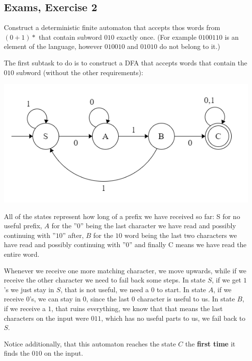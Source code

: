 \subsection {Exams, Exercise 2}


Construct a deterministic finite automaton that accepts thos words from $(0+1)*$ that contain subword $010$ exactly once. (For example $0100110$ is an element of the language, however $010010$ and $01010$ do not belong to it.)


The first subtask to do is to construct a DFA that accepts words that contain the $010$ subword (without the other requirements):

\begin{center}
    \includegraphics[width=\linewidth]{./exams/02/step_1.png}
\end{center}

All of the states represent how long of a prefix we have received so far: S for no useful prefix, $A$ for the ''$0$'' being the last character we have read and possibly continuing with ''$10$'' after, $B$ for the $10$ word being the last two characters we have read and possibly continuing with ''$0$'' and finally C means we have read the entire word.

Whenever we receive one more matching character, we move upwards, while if we receive the other character we need to fail back some steps. In state $S$, if we get $1$'s we just stay in $S$, that is not useful, we need a $0$ to start. In state $A$, if we receive $0$'s, we can stay in $0$, since the last $0$ character is useful to us. In state $B$, if we receive a $1$, that ruins everything, we know that that means the last characters on the input were $011$, which has no useful parts to us, we fail back to $S$.

Notice additionally, that this automaton reaches the state $C$ the \textbf{first time} it finds the $010$ on the input.

